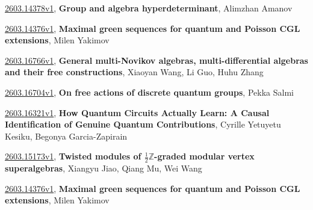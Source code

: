 \documentclass[9pt, a4paper]{article}
\theoremstyle{plain}
\theoremstyle{definition}
\theoremstyle{remark}
\newcommand{\arxiv}[3]{\href{https://arxiv.org/abs/#1}{#1}, \textbf{\textcolor{arxivblue}{#2}}, #3}
\begin{document}
\arxiv{2603.14378v1}{Group and algebra hyperdeterminant}{Alimzhan Amanov}

\arxiv{2603.14376v1}{Maximal green sequences for quantum and Poisson CGL extensions}{Milen Yakimov}

\arxiv{2603.16766v1}{General multi-Novikov algebras, multi-differential algebras and their free constructions}{Xiaoyan Wang, Li Guo, Huhu Zhang}

\arxiv{2603.16704v1}{On free actions of discrete quantum groups}{Pekka Salmi}

\arxiv{2603.16321v1}{How Quantum Circuits Actually Learn: A Causal Identification of Genuine Quantum Contributions}{Cyrille Yetuyetu Kesiku, Begonya Garcia-Zapirain}

\arxiv{2603.15173v1}{Twisted modules of $\frac{1}{2}\mathbb{Z}$-graded modular vertex superalgebras}{Xiangyu Jiao, Qiang Mu, Wei Wang}

\arxiv{2603.14376v1}{Maximal green sequences for quantum and Poisson CGL extensions}{Milen Yakimov}

\end{document}
